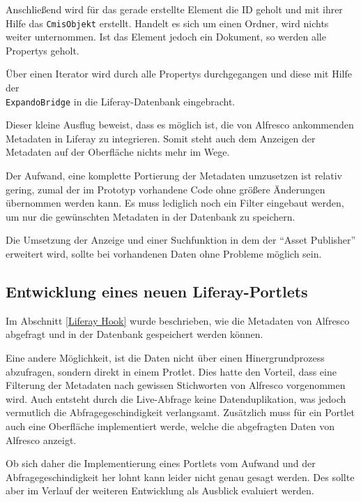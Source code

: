 Anschlie\ss{}end wird f\"ur das gerade erstellte Element die ID geholt und mit ihrer Hilfe das \texttt{CmisObjekt} erstellt.
Handelt es sich um einen Ordner, wird nichts weiter unternommen. Ist das Element jedoch ein Dokument, so werden alle Propertys geholt.

\"Uber einen Iterator wird durch alle Propertys durchgegangen und diese mit Hilfe der \\\texttt{ExpandoBridge} in die Liferay-Datenbank eingebracht.
\newpage


Dieser kleine Ausflug beweist, dass es m\"oglich ist, die von Alfresco ankommenden Metadaten in Liferay zu integrieren. Somit steht auch dem Anzeigen der Metadaten auf der Oberfl\"ache nichts mehr im Wege. \cite{Chemistry_examples}

Der Aufwand, eine komplette Portierung der Metadaten umzusetzen ist relativ gering, zumal der im Prototyp vorhandene Code ohne gr\"o\ss{}ere \"Anderungen \"ubernommen werden kann. Es muss lediglich noch ein Filter eingebaut werden, um nur die gew\"unschten Metadaten in der Datenbank zu speichern.

Die Umsetzung der Anzeige und einer Suchfunktion in dem der "`Asset Publisher"' erweitert wird, sollte bei vorhandenen Daten ohne Probleme m\"oglich sein.

\subsection{Entwicklung eines neuen Liferay-Portlets}\label{Liferay Portlet}
Im Abschnitt \ref{Liferay Hook} wurde beschrieben, wie die Metadaten von Alfresco abgefragt und in der Datenbank gespeichert werden k\"onnen.

Eine andere  M\"oglichkeit, ist die Daten nicht \"uber einen Hinergrundprozess abzufragen, sondern direkt in einem Protlet. Dies hatte den Vorteil, dass eine Filterung der Metadaten nach gewissen Stichworten von Alfresco vorgenommen wird. Auch entsteht durch die Live-Abfrage keine Datenduplikation, was jedoch vermutlich die Abfragegeschindigkeit verlangsamt.
Zus\"atzlich muss f\"ur ein Portlet auch eine Oberfl\"ache implementiert werde, welche die abgefragten Daten von Alfresco anzeigt.

Ob sich daher die Implementierung eines Portlets vom Aufwand und der Abfragegeschindigkeit her lohnt kann leider nicht genau gesagt werden. Des sollte aber im Verlauf der weiteren Entwicklung als Ausblick evaluiert werden.

